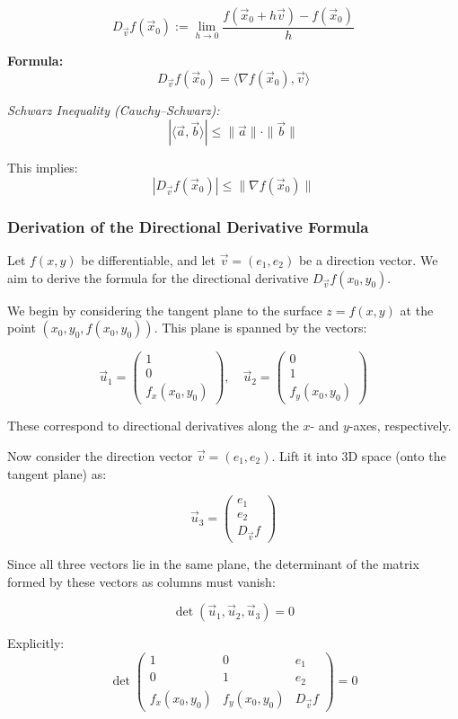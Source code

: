 \[
D_{\vec{v}}f(\vec{x}_0) := \lim_{h \to 0} \frac{f(\vec{x}_0 + h\vec{v}) - f(\vec{x}_0)}{h}
\]

\textbf{Formula:}
\[
D_{\vec{v}}f(\vec{x}_0) = \langle \nabla f(\vec{x}_0), \vec{v} \rangle
\]

\emph{Schwarz Inequality (Cauchy–Schwarz):}
\[
|\langle \vec{a}, \vec{b} \rangle| \le \|\vec{a}\| \cdot \|\vec{b}\|
\]

This implies:
\[
|D_{\vec{v}}f(\vec{x}_0)| \le \|\nabla f(\vec{x}_0)\|
\]

\subsubsection{Derivation of the Directional Derivative Formula}

Let \( f(x, y) \) be differentiable, and let \( \vec{v} = (e_1, e_2) \) be a direction vector. We aim to derive the formula for the directional derivative \( D_{\vec{v}} f(x_0, y_0) \).

We begin by considering the tangent plane to the surface \( z = f(x, y) \) at the point \( (x_0, y_0, f(x_0, y_0)) \). This plane is spanned by the vectors:

\[
\vec{u}_1 = 
\begin{pmatrix}
1 \\
0 \\
f_x(x_0, y_0)
\end{pmatrix}, \quad
\vec{u}_2 = 
\begin{pmatrix}
0 \\
1 \\
f_y(x_0, y_0)
\end{pmatrix}
\]

These correspond to directional derivatives along the \( x \)- and \( y \)-axes, respectively.

Now consider the direction vector \( \vec{v} = (e_1, e_2) \). Lift it into 3D space (onto the tangent plane) as:

\[
\vec{u}_3 =
\begin{pmatrix}
e_1 \\
e_2 \\
D_{\vec{v}}f
\end{pmatrix}
\]

Since all three vectors lie in the same plane, the determinant of the matrix formed by these vectors as columns must vanish:

\[
\det(\vec{u}_1, \vec{u}_2, \vec{u}_3) = 0
\]

Explicitly:
\[
\det
\begin{pmatrix}
1 & 0 & e_1 \\
0 & 1 & e_2 \\
f_x(x_0, y_0) & f_y(x_0, y_0) & D_{\vec{v}}f
\end{pmatrix} = 0
\]

